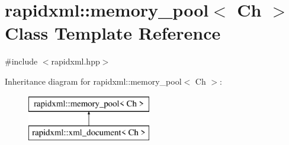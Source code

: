 \hypertarget{classrapidxml_1_1memory__pool}{\section{rapidxml\-:\-:memory\-\_\-pool$<$ Ch $>$ Class Template Reference}
\label{classrapidxml_1_1memory__pool}
}


{\ttfamily \#include $<$rapidxml.\-hpp$>$}

Inheritance diagram for rapidxml\-:\-:memory\-\_\-pool$<$ Ch $>$\-:\begin{figure}[H]
\begin{center}
\leavevmode
\includegraphics[height=2.000000cm]{classrapidxml_1_1memory__pool}
\end{center}
\end{figure}
